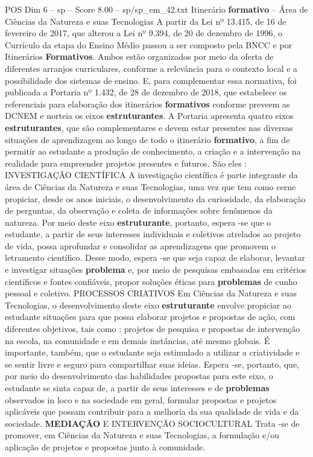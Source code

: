 \begin{textsample}{POS Dim 6 – sp – Score 8.00 – sp/sp\_em\_42.txt}  \label{ex:f6_pos_087}
Itinerário \textbf{formativo} – Área de Ciências da Natureza e suas Tecnologias A partir da Lei nº 13.415, de 16 de fevereiro de 2017, que alterou a Lei nº 9.394, de 20 de dezembro de 1996, o Currículo da etapa do Ensino Médio passou a ser composto pela BNCC e por Itinerários \textbf{Formativos}.
Ambos estão organizados por meio da oferta de diferentes arranjos curriculares, conforme a relevância para o contexto local e a possibilidade dos sistemas de ensino.
E, para complementar essa normativa, foi publicada a Portaria nº 1.432, de 28 de dezembro de 2018, que estabelece os referenciais para elaboração dos itinerários \textbf{formativos} conforme preveem as DCNEM e norteia os eixos \textbf{estruturantes}.
A Portaria apresenta quatro eixos \textbf{estruturantes}, que são complementares e devem estar presentes nas diversas situações de aprendizagem ao longo de todo o itinerário \textbf{formativo}, a fim de permitir ao estudante a produção de conhecimento, a criação e a intervenção na realidade para empreender projetos presentes e futuros.
São eles : INVESTIGAÇÃO CIENTÍFICA A investigação científica é parte integrante da área de Ciências da Natureza e suas Tecnologias, uma vez que tem como cerne propiciar, desde os anos iniciais, o desenvolvimento da curiosidade, da elaboração de perguntas, da observação e coleta de informações sobre fenômenos da natureza.
Por meio deste eixo \textbf{estruturante}, portanto, espera -se que o estudante, a partir de seus interesses individuais e coletivos atrelados ao projeto de vida, possa aprofundar e consolidar as aprendizagens que promovem o letramento científico.
Desse modo, espera -se que seja capaz de elaborar, levantar e investigar situações \textbf{problema} e, por meio de pesquisas embasadas em critérios científicos e fontes confiáveis, propor soluções éticas para \textbf{problemas} de cunho pessoal e coletivo.
PROCESSOS CRIATIVOS Em Ciências da Natureza e suas Tecnologias, o desenvolvimento deste eixo \textbf{estruturante} envolve propiciar ao estudante situações para que possa elaborar projetos e propostas de ação, com diferentes objetivos, tais como : projetos de pesquisa e propostas de intervenção na escola, na comunidade e em demais instâncias, até mesmo globais.
É importante, também, que o estudante seja estimulado a utilizar a criatividade e se sentir livre e seguro para compartilhar suas ideias.
Espera -se, portanto, que, por meio do desenvolvimento das habilidades propostas para este eixo, o estudante se sinta capaz de, a partir de seus interesses e de \textbf{problemas} observados in loco e na sociedade em geral, formular propostas e projetos aplicáveis que possam contribuir para a melhoria da sua qualidade de vida e da sociedade. \textbf{MEDIAÇÃO} E INTERVENÇÃO SOCIOCULTURAL Trata -se de promover, em Ciências da Natureza e suas Tecnologias, a formulação e/ou aplicação de projetos e propostas junto à comunidade.

\end{textsample}
